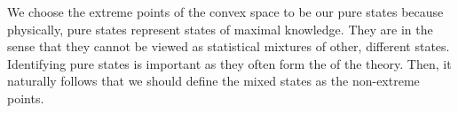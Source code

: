 
We choose the extreme points of the convex space to be our pure states because physically, pure states represent states of maximal knowledge. They are  in the sense that they cannot be viewed as statistical mixtures of other, different states. Identifying pure states is important as they often form the  of the theory. Then, it naturally follows that we should define the mixed states as the non-extreme points.

